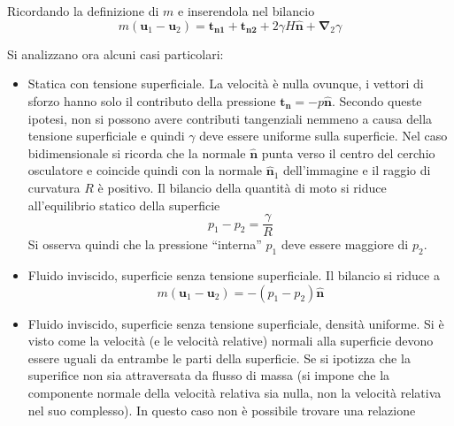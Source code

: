 \noindent
Ricordando la definizione di $m$ e inserendola nel bilancio
\begin{equation}
 m ( \bm{u}_1 - \bm{u}_2 ) =
    \bm{t_{n1}} + \bm{t_{n2}} + 2 \gamma H \bm{\hat{n}} + \bm{\nabla}_2 \gamma
\end{equation}

\noindent
Si analizzano ora alcuni casi particolari:
\begin{itemize}
\item Statica con tensione superficiale. La velocità è nulla ovunque, i vettori di sforzo hanno solo il contributo della pressione
 $\bm{t_n} = -p \bm{\hat{n}}$. Secondo queste ipotesi, non si possono avere contributi tangenziali nemmeno a causa della tensione 
 superficiale e quindi $\gamma$ deve essere uniforme sulla superficie. Nel caso bidimensionale si ricorda che la normale $\bm{\hat{n}}$
 punta verso il centro del cerchio osculatore e coincide quindi con la normale $\bm{\hat{n}}_1$ dell'immagine e il raggio di curvatura $R$ è positivo.
 Il bilancio della quantità di moto si riduce all'equilibrio statico della superficie
 \begin{equation}
   p_1 - p_2 = \frac{\gamma}{R}
 \end{equation}
 Si osserva quindi che la pressione ``interna'' $p_1$ deve essere maggiore di $p_2$.
\item Fluido inviscido, superficie senza tensione superficiale. Il bilancio si riduce a 
\begin{equation}
  m ( \bm{u}_1 - \bm{u}_2 ) = - (p_1 - p_2) \bm{\hat{n}}
\end{equation}
\item Fluido inviscido, superficie senza tensione superficiale, densità uniforme. Si è visto come la 
  velocità (e le velocità relative) normali alla superficie devono essere uguali da entrambe le parti
  della superficie. %
  Se si ipotizza che la superifice non sia attraversata da flusso di massa (si impone che la componente normale della velocità relativa sia nulla,
  non la velocità relativa nel suo complesso). In questo caso non è possibile trovare una relazione 

\end{itemize}
